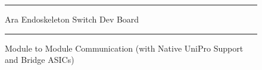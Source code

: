 \begin{figure}[htbp]
  \centering
    \rule{35em}{0.5pt}
  \caption[Ara Endoskeleton Switch Board]{Ara Endoskeleton Switch Dev Board}
  \label{fig:endo}
\end{figure}

\begin{figure}[htbp]
  \centering
     \rule{35em}{0.8pt}
  \caption[Module to Module Communication (with Native UniPro Support and Bridge ASICs)]{Module to Module Communication (with Native UniPro Support and Bridge ASICs)}
  \label{fig:endo}
\end{figure}

